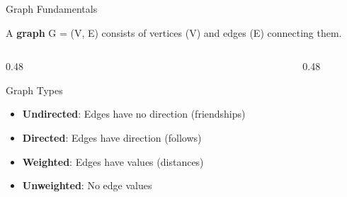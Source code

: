 \documentclass[aspectratio=169,xcolor=dvipsnames]{beamer}
\begin{document}
\begin{frame}{Graph Fundamentals}
  \begin{definition}
    A \textbf{graph} G = (V, E) consists of vertices (V) and edges (E) connecting them.
  \end{definition}

  \begin{columns}
    \begin{column}{0.48\textwidth}
      \begin{block}{Graph Types}
        \begin{itemize}
          \item \textbf{Undirected}: Edges have no direction (friendships)
          \item \textbf{Directed}: Edges have direction (follows)
          \item \textbf{Weighted}: Edges have values (distances)
          \item \textbf{Unweighted}: No edge values
        \end{itemize}
      \end{block}
    \end{column}
    \begin{column}{0.48\textwidth}
      \begin{center}
      \end{center}
    \end{column}
  \end{columns}
\end{frame}
\end{document}

